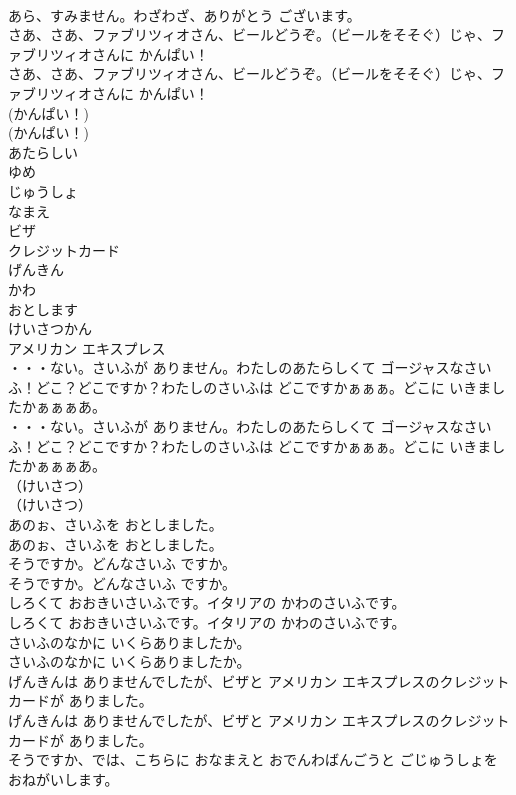 \documentclass[8pt]{extreport}
\begin{document}
\begin{CJK}{UTF8}{min}
\\	あら、すみません。わざわざ、ありがとう ございます。 
\\	さあ、さあ、ファブリツィオさん、ビールどうぞ。（ビールをそそぐ）じゃ、ファブリツィオさんに かんぱい！	
\\	さあ、さあ、ファブリツィオさん、ビールどうぞ。（ビールをそそぐ）じゃ、ファブリツィオさんに かんぱい！ 
\\	(かんぱい！)	
\\	(かんぱい！) 
\\	あたらしい
\\	ゆめ
\\	じゅうしょ
\\	なまえ
\\	ビザ
\\	クレジットカード
\\	げんきん
\\	かわ
\\	おとします
\\	けいさつかん
\\	アメリカン エキスプレス
\\	・・・ない。さいふが ありません。わたしのあたらしくて ゴージャスなさいふ！どこ？どこですか？わたしのさいふは どこですかぁぁぁ。どこに いきましたかぁぁぁあ。	
\\	・・・ない。さいふが ありません。わたしのあたらしくて ゴージャスなさいふ！どこ？どこですか？わたしのさいふは どこですかぁぁぁ。どこに いきましたかぁぁぁあ。 
\\	（けいさつ）	
\\	（けいさつ） 
\\	あのぉ、さいふを おとしました。	
\\	あのぉ、さいふを おとしました。 
\\	そうですか。どんなさいふ ですか。	
\\	そうですか。どんなさいふ ですか。 
\\	しろくて おおきいさいふです。イタリアの かわのさいふです。	
\\	しろくて おおきいさいふです。イタリアの かわのさいふです。 
\\	さいふのなかに いくらありましたか。	
\\	さいふのなかに いくらありましたか。 
\\	げんきんは ありませんでしたが、ビザと アメリカン エキスプレスのクレジット カードが ありました。	
\\	げんきんは ありませんでしたが、ビザと アメリカン エキスプレスのクレジット カードが ありました。 
\\	そうですか、では、こちらに おなまえと おでんわばんごうと ごじゅうしょを おねがいします。	

\end{CJK}
\end{document}
